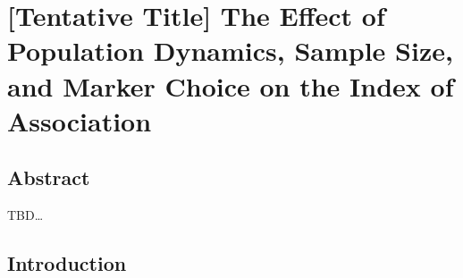 \documentclass[double,12pt]{beavtex}
\begin{document}
  \chapter{{[}Tentative Title{]} The Effect of Population Dynamics, Sample
  Size, and Marker Choice on the Index of
  Association}\label{tentative-title-the-effect-of-population-dynamics-sample-size-and-marker-choice-on-the-index-of-association}
  
  \section{Abstract}\label{abstract-3}
  
  TBD\ldots{}
  
  \section{Introduction}\label{introduction-4}
  
\end{document}
